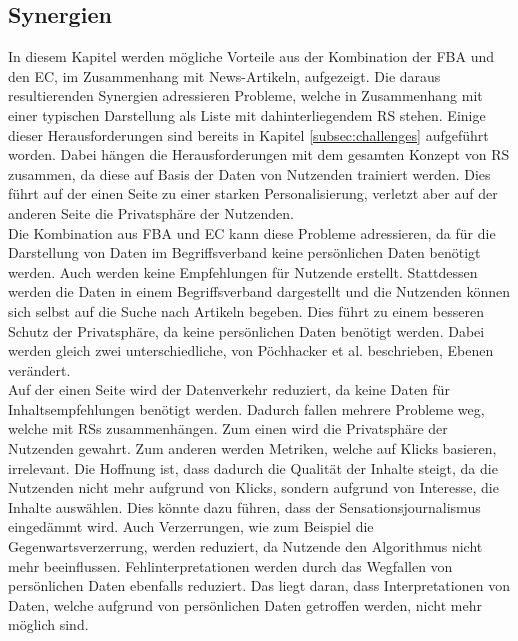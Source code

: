 \subsection{Synergien}\label{subsec:synergies}
In diesem Kapitel werden mögliche Vorteile aus der Kombination der \ac{FBA} und den \ac{EC}, im Zusammenhang mit News-Artikeln, aufgezeigt.
Die daraus resultierenden Synergien adressieren Probleme, welche in Zusammenhang mit einer typischen Darstellung als Liste mit dahinterliegendem \ac{RS} stehen.
Einige dieser Herausforderungen sind bereits in Kapitel \ref{subsec:challenges} aufgeführt worden.
Dabei hängen die Herausforderungen mit dem gesamten Konzept von \ac{RS} zusammen, da diese auf Basis der Daten von Nutzenden trainiert werden.
Dies führt auf der einen Seite zu einer starken Personalisierung, verletzt aber auf der anderen Seite die Privatsphäre der Nutzenden.\\

Die Kombination aus \ac{FBA} und \ac{EC} kann diese Probleme adressieren, da für die Darstellung von Daten im Begriffsverband keine persönlichen Daten benötigt werden.
Auch werden keine Empfehlungen für Nutzende erstellt.
Stattdessen werden die Daten in einem Begriffsverband dargestellt und die Nutzenden können sich selbst auf die Suche nach Artikeln begeben.
Dies führt zu einem besseren Schutz der Privatsphäre, da keine persönlichen Daten benötigt werden.
Dabei werden gleich zwei unterschiedliche, von Pöchhacker et al. beschrieben, Ebenen verändert.\\

Auf der einen Seite wird der Datenverkehr reduziert, da keine Daten für Inhaltsempfehlungen benötigt werden.
Dadurch fallen mehrere Probleme weg, welche mit \acp{RS} zusammenhängen.
Zum einen wird die Privatsphäre der Nutzenden gewahrt.
Zum anderen werden Metriken, welche auf Klicks basieren, irrelevant.
Die Hoffnung ist, dass dadurch die Qualität der Inhalte steigt, da die Nutzenden nicht mehr aufgrund von Klicks, sondern aufgrund von Interesse, die Inhalte auswählen.
Dies könnte dazu führen, dass der Sensationsjournalismus eingedämmt wird.
Auch Verzerrungen, wie zum Beispiel die Gegenwartsverzerrung, werden reduziert, da Nutzende den Algorithmus nicht mehr beeinflussen.
Fehlinterpretationen werden durch das Wegfallen von persönlichen Daten ebenfalls reduziert.
Das liegt daran, dass Interpretationen von Daten, welche aufgrund von persönlichen Daten getroffen werden, nicht mehr möglich sind. \\

